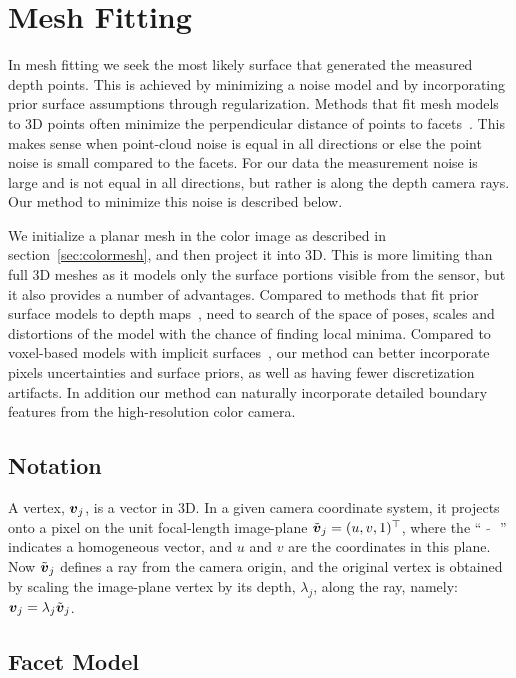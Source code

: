 \section{Mesh Fitting}
\label{sec:fitting}

In mesh fitting we seek the most likely surface that generated the measured depth points.  This is achieved by minimizing a noise model and by incorporating prior surface assumptions through regularization.  Methods that fit mesh models to 3D points often minimize the perpendicular distance of points to facets~\cite{Sienz2000}.  This makes sense when point-cloud noise is equal in all directions or else the point noise is small compared to the facets.  For our data the measurement noise is large and is not equal in all directions, but rather is along the depth camera rays.  Our method to minimize this noise is described below.

We initialize a planar mesh in the color image as described in section~\ref{sec:colormesh}, and then project it into $3$D.  This is more limiting than full $3$D meshes as it models only the surface portions visible from the sensor, but it also provides a number of advantages.  Compared to methods that fit prior surface models to depth maps~\cite{Turk1994,Hoppe1994,Sienz2000}, need to search of the space of poses, scales and distortions of the model with the chance of finding local minima.  Compared to voxel-based models with implicit surfaces~\cite{Curless:1996}, our method can better incorporate pixels uncertainties and surface priors, as well as having fewer discretization artifacts.  In addition our method can naturally incorporate detailed boundary features from the high-resolution color camera.

\subsection{Notation}

A vertex, $\boldsymbol{v}_j$, is a vector in $3$D.  In a given camera coordinate system, it projects onto a pixel on the unit focal-length image-plane $\tilde{\boldsymbol{v}}_j=(u,v,1)^\top$, where the `` $\tilde{\text{ }}$ '' indicates a homogeneous vector, and $u$ and $v$ are the coordinates in this plane.  Now $\tilde{\boldsymbol{v}}_j$ defines a ray from the camera origin, and the original vertex is obtained by scaling the image-plane vertex by its depth, $\lambda_j$, along the ray, namely: $\boldsymbol{v}_j = \lambda_j\tilde{\boldsymbol{v}}_j$. 

\subsection{Facet Model}

